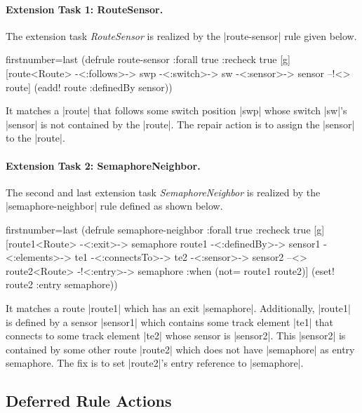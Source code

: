 \documentclass[submission]{eptcs}
\newcommand{\code}{\clojureinline}
\begin{document}
\paragraph{Extension Task 1: RouteSensor.}

The extension task \emph{RouteSensor} is realized by the \code|route-sensor|
rule given below.

\begin{clojurecode*}{firstnumber=last}
(defrule route-sensor {:forall true :recheck true} [g]
  [route<Route> -<:follows>-> swp -<:switch>-> sw
   -<:sensor>-> sensor --!<> route]
  (eadd! route :definedBy sensor))
\end{clojurecode*}

It matches a \code|route| that follows some switch position \code|swp| whose
switch \code|sw|'s \code|sensor| is not contained by the \code|route|.  The
repair action is to assign the \code|sensor| to the \code|route|.


\paragraph{Extension Task 2: SemaphoreNeighbor.}

The second and last extension task \emph{SemaphoreNeighbor} is realized by the
\code|semaphore-neighbor| rule defined as shown below.

\begin{clojurecode*}{firstnumber=last}
(defrule semaphore-neighbor {:forall true :recheck true} [g]
  [route1<Route> -<:exit>-> semaphore
   route1 -<:definedBy>-> sensor1 -<:elements>-> te1
   -<:connectsTo>-> te2 -<:sensor>-> sensor2
   --<> route2<Route> -!<:entry>-> semaphore
   :when (not= route1 route2)]
  (eset! route2 :entry semaphore))
\end{clojurecode*}

It matches a route \code|route1| which has an exit \code|semaphore|.
Additionally, \code|route1| is defined by a sensor \code|sensor1| which
contains some track element \code|te1| that connects to some track element
\code|te2| whose sensor is \code|sensor2|.  This \code|sensor2| is contained by
some other route \code|route2| which does not have \code|semaphore| as entry
semaphore.  The fix is to set \code|route2|'s entry reference to
\code|semaphore|.


\subsection{Deferred Rule Actions}
\label{sec:deferred-actions}
\end{document}

